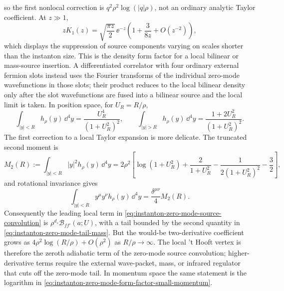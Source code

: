 \begin{proposition}
\begin{equation}
\end{equation}
so the first nonlocal correction is \(q^2\rho^2\log(|q|\rho)\), not an
ordinary analytic Taylor coefficient.  At \(z\gg1\),
\begin{equation}
  zK_1(z)
  =
  \sqrt{\frac{\pi z}{2}}\,
  \ee^{-z}
  \left(1+\frac{3}{8z}+O(z^{-2})\right),
  \label{eq:instanton-zero-mode-form-factor-large-momentum}
\end{equation}
which displays the suppression of source components varying on scales
shorter than the instanton size.  This is the density form factor for a local
bilinear or mass-source insertion.  A differentiated correlator with four
ordinary external fermion slots instead uses the Fourier transforms of the
individual zero-mode wavefunctions in those slots; their product reduces to
the local bilinear density only after the slot wavefunctions are fused into a
bilinear source and the local limit is taken.  In position space, for
\(U_R=R/\rho\),
\begin{equation}
  \int_{|y|<R}h_\rho(y)\,\dd^4y
  =
  \frac{U_R^4}{(1+U_R^2)^2},
  \qquad
  \int_{|y|>R}h_\rho(y)\,\dd^4y
  =
  \frac{1+2U_R^2}{(1+U_R^2)^2}.
  \label{eq:instanton-zero-mode-tail-mass}
\end{equation}
The first correction to a local Taylor expansion is more delicate.  The
truncated second moment is
\begin{equation}
  M_2(R)
  :=
  \int_{|y|<R}|y|^2h_\rho(y)\,\dd^4y
  =
  2\rho^2
  \left[
    \log(1+U_R^2)
    +\frac{2}{1+U_R^2}
    -\frac{1}{2(1+U_R^2)^2}
    -\frac32
  \right],
  \label{eq:instanton-zero-mode-second-moment}
\end{equation}
and rotational invariance gives
\[
  \int_{|y|<R}y^\mu y^\nu h_\rho(y)\,\dd^4y
  =
  \frac{\delta^{\mu\nu}}4M_2(R).
\]
Consequently the leading local term in
\eqref{eq:instanton-zero-mode-source-convolution} is
\(\rho^{d_s}\mathcal B_{ff'}(a;U)\), with a tail bounded by the second
quantity in \eqref{eq:instanton-zero-mode-tail-mass}.  But the would-be
two-derivative coefficient grows as
\(4\rho^2\log(R/\rho)+O(\rho^2)\) as \(R/\rho\to\infty\).  The local
't Hooft vertex is therefore the zeroth adiabatic term of the zero-mode
source convolution; higher-derivative terms require the external wave-packet,
mass, or infrared regulator that cuts off the zero-mode tail.  In momentum
space the same statement is the logarithm in
\eqref{eq:instanton-zero-mode-form-factor-small-momentum}.
\end{proposition}


